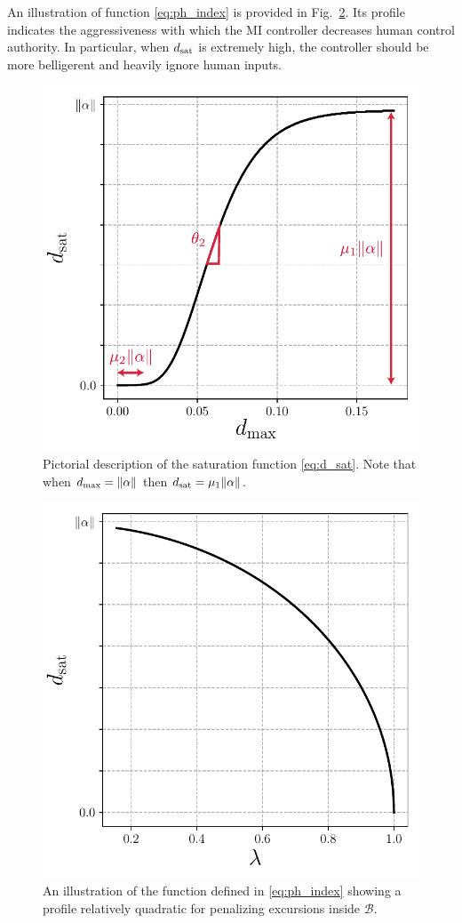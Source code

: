 \noindent An illustration of function \eqref{eq:ph_index} is provided in Fig.~\ref{fig:ph_index}. Its profile indicates the aggressiveness with which the MI controller decreases human control authority. In particular, when $d_{\rm sat}$ is extremely high, the controller should be more belligerent and heavily ignore human inputs. 

\begin{figure}[t]
\centering
	\includegraphics[width=.35\textwidth]{figures/dsat_edited}
	\vspace{-0.35cm}
	\caption{Pictorial description of the saturation function \eqref{eq:d_sat}. Note that when $d_{\rm max} = \|\alpha\|$ then $d_{\rm sat} = \mu_1\|\alpha\|$.}\label{fig:d_sat}%
\end{figure}

\begin{figure}[t]
\centering
	\includegraphics[width=.35\textwidth]{figures/decay_fcn}
	\vspace{-0.35cm}
	\caption{An illustration of the function defined in \eqref{eq:ph_index} showing a profile relatively quadratic for penalizing excursions inside $\mathcal{B}$.}\label{fig:ph_index}%
\end{figure}